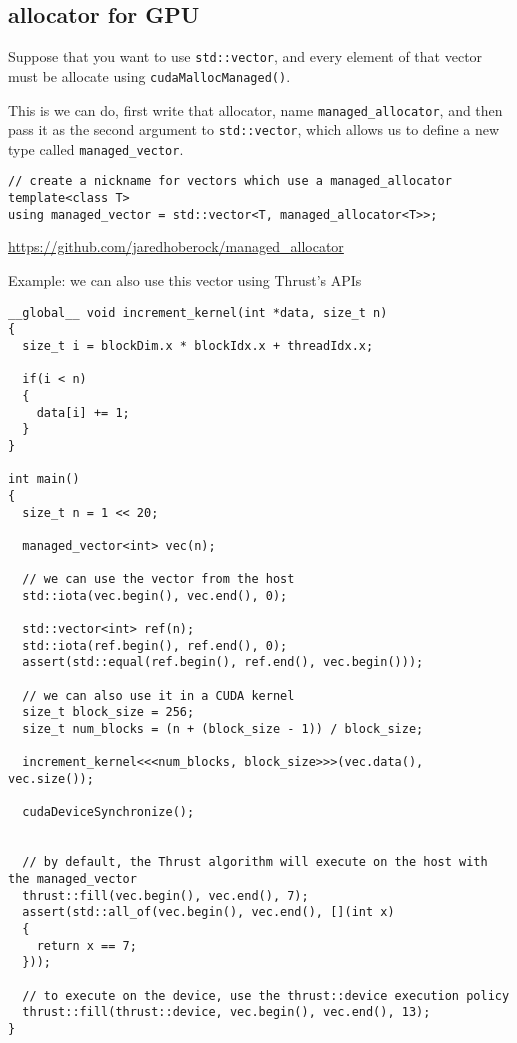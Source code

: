 \subsection{allocator for GPU}
\label{sec:allocator-GPU}


Suppose that you want to use \verb!std::vector!, and every element of that
vector must be allocate using \verb!cudaMallocManaged()!.

This is we can do, first write that allocator, name \verb!managed_allocator!,
and then pass it as the second argument to \verb!std::vector!, which allows us
to define a new type called \verb!managed_vector!.

\begin{lstlisting}
// create a nickname for vectors which use a managed_allocator
template<class T>
using managed_vector = std::vector<T, managed_allocator<T>>;
\end{lstlisting}
\url{https://github.com/jaredhoberock/managed_allocator}


Example: we can also use this vector using Thrust's APIs
\begin{lstlisting}
__global__ void increment_kernel(int *data, size_t n)
{
  size_t i = blockDim.x * blockIdx.x + threadIdx.x;

  if(i < n)
  {
    data[i] += 1;
  }
}

int main()
{
  size_t n = 1 << 20;

  managed_vector<int> vec(n);

  // we can use the vector from the host
  std::iota(vec.begin(), vec.end(), 0);

  std::vector<int> ref(n);
  std::iota(ref.begin(), ref.end(), 0);
  assert(std::equal(ref.begin(), ref.end(), vec.begin()));

  // we can also use it in a CUDA kernel
  size_t block_size = 256;
  size_t num_blocks = (n + (block_size - 1)) / block_size;

  increment_kernel<<<num_blocks, block_size>>>(vec.data(), vec.size());

  cudaDeviceSynchronize();
  
  
  // by default, the Thrust algorithm will execute on the host with the managed_vector
  thrust::fill(vec.begin(), vec.end(), 7);
  assert(std::all_of(vec.begin(), vec.end(), [](int x)
  {
    return x == 7;
  }));

  // to execute on the device, use the thrust::device execution policy
  thrust::fill(thrust::device, vec.begin(), vec.end(), 13);
}
\end{lstlisting}

